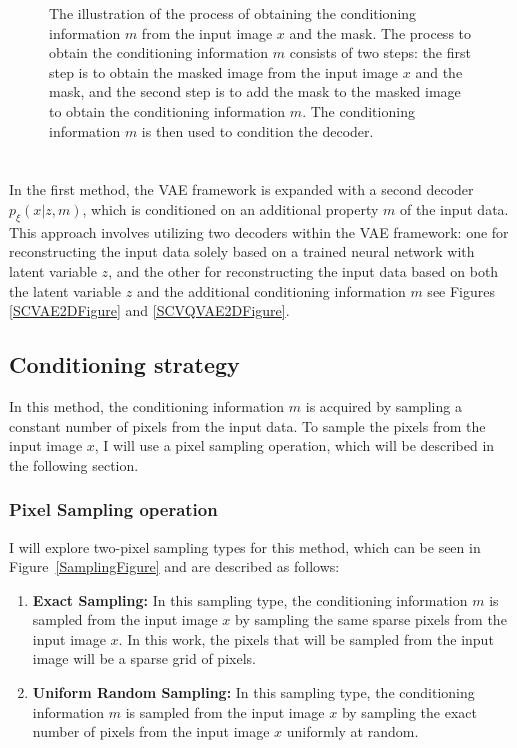 \begin{figure}
    \centering
    
    \caption[The illustration of the process of obtaining the conditioning information $m$ from the input image $x$ and the mask.]%
    {
        The illustration of the process of obtaining the conditioning information $m$ from the input image $x$ and the mask. The process to obtain the conditioning information $m$ consists of two steps: the first step is to obtain the masked image from the input image $x$ and the mask, and the second step is to add the mask to the masked image to obtain the conditioning information $m$. The conditioning information $m$ is then used to condition the decoder.
    }\label{ConditioningFigure}
\end{figure}

\section{}

In the first method, the VAE framework is expanded with a second decoder
$p_\xi(x|z,m)$, which is conditioned on an additional property $m$ of the input
data. This approach involves utilizing two decoders within the VAE framework:
one for reconstructing the input data solely based on a trained neural network with  latent variable $z$,
and the other for reconstructing the input data based on both the latent
variable $z$ and the additional conditioning information $m$ see Figures \ref{SCVAE2DFigure} and \ref{SCVQVAE2DFigure}.

\subsection{Conditioning strategy}

In this method, the conditioning information $m$ is acquired by sampling a
constant number of pixels from the input data. To sample the pixels from the
input image $x$, I will use a pixel sampling operation, which will be described
in the following section.

\subsubsection{Pixel Sampling operation}

I will explore two-pixel sampling types for this method,
which can be seen in Figure~\ref{SamplingFigure} and are described as follows:

\begin{enumerate}
    \item \textbf{Exact Sampling:} In this sampling type, the conditioning information $m$ is sampled from the input image $x$ by sampling the same sparse pixels from the input image $x$. In this work, the pixels that will be sampled from the input image will be a sparse grid of pixels.
    \item \textbf{Uniform Random Sampling:} In this sampling type, the conditioning information $m$ is sampled from the input image $x$ by sampling the exact number of pixels from the input image $x$ uniformly at random.
\end{enumerate}

